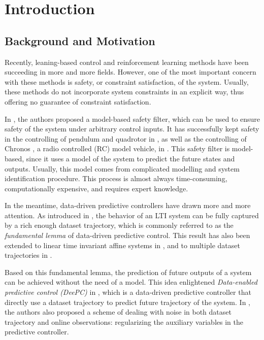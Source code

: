 \chapter{Introduction}\label{chap:introduction}


\section{Background and Motivation}\label{sec:motivation-and-background}

Recently, leaning-based control and reinforcement learning methods have been succeeding in more and more fields.
However, one of the most important concern with these methods is safety, or constraint satisfaction, of the system.
Usually, these methods do not incorporate system constraints in an explicit way, thus offering no guarantee of constraint satisfaction.

In \cite{wabersichPredictiveSafetyFilter2021a}, the authors proposed a model-based safety filter, which can be used to ensure safety of the system under arbitrary control inputs.
It has successfully kept safety in the controlling of pendulum and quadrotor in \cite{wabersichPredictiveSafetyFilter2021a}, as well as the controlling of Chronos \cite{carronChronosCRSDesign2022}, a radio controlled (RC) model vehicle, in \cite{tearlePredictiveSafetyFilterRacing2021}.
This safety filter is model-based, since it uses a model of the system to predict the future states and outputs.
Usually, this model comes from complicated modelling and system identification procedure.
This process is almost always time-consuming, computationally expensive, and requires expert knowledge.

In the meantime, data-driven predictive controllers have drawn more and more attention.
As introduced in \cite{willemsNotePersistencyExcitation2005}, the behavior of an LTI system can be fully captured by a rich enough dataset trajectory, which is commonly referred to as the \emph{fundamental lemma} of data-driven predictive control.
This result has also been extended to linear time invariant affine systems in \cite{martinelliDataDrivenAffine2022}, and to multiple dataset trajectories in \cite{vanwaardeMultiple2020}.

Based on this fundamental lemma, the prediction of future outputs of a system can be achieved without the need of a model.
This idea enlightened \emph{Data-enabled predictive control (DeePC)} in \cite{coulsonDataenabledPredictiveControl2019}, which is a data-driven predictive controller that directly use a dataset trajectory to predict future trajectory of the system.
In \cite{coulsonDataenabledPredictiveControl2019}, the authors also proposed a scheme of dealing with noise in both dataset trajectory and online observations: regularizing the auxiliary variables in the predictive controller.

